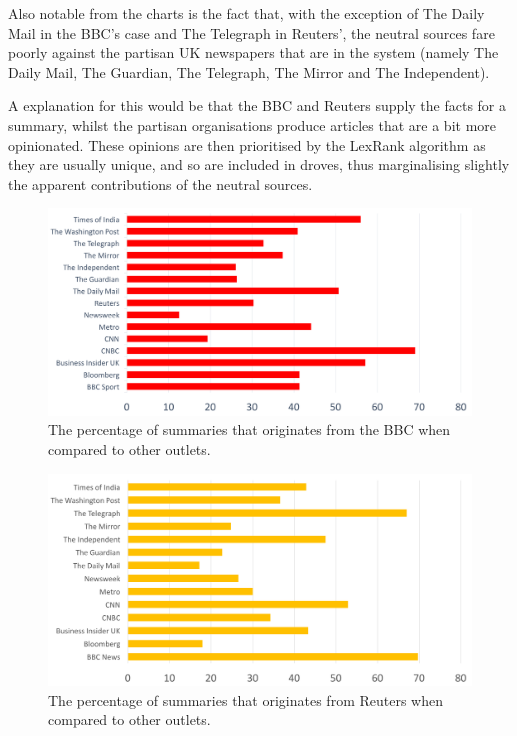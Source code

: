 \documentclass[12pt]{article}
\begin{document}
Also notable from the charts is the fact that, with the exception of The Daily Mail in the BBC's case and The Telegraph in Reuters', the neutral sources fare poorly against the partisan UK newspapers that are in the system (namely The Daily Mail, The Guardian, The Telegraph, The Mirror and The Independent). 

A explanation for this would be that the BBC and Reuters supply the facts for a summary, whilst the partisan organisations produce articles that are a bit more opinionated. These opinions are then prioritised by the LexRank algorithm as they are usually unique, and so are included in droves, thus marginalising slightly the apparent contributions of the neutral sources. 

\begin{figure}[ht!]
  \centering
    \includegraphics[scale=0.3]{bbc-news.png}
   \caption[A graph depicting responses to the User Interface Survey]{The percentage of summaries that originates from the BBC when compared to other outlets.}
   \label{bbc-news}
\end{figure} 

\begin{figure}[ht!]
  \centering
    \includegraphics[scale=0.3]{reuters.png}
   \caption[A graph depicting responses to the User Interface Survey]{The percentage of summaries that originates from Reuters when compared to other outlets.}
   \label{reuters}
\end{figure} 
\end{document}
